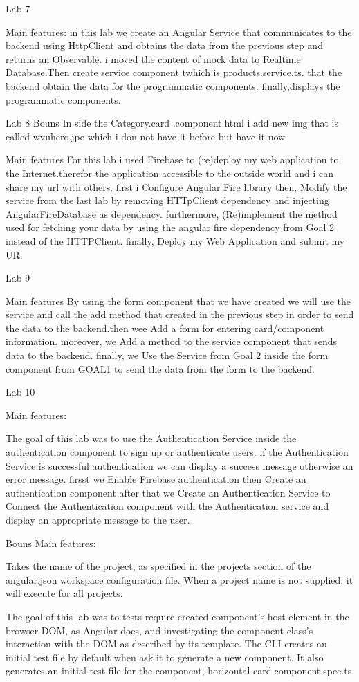 Lab 7

Main features:
in this lab we create an Angular Service that communicates to the backend using HttpClient and obtains the data from the previous step and returns an Observable. 
i moved the content of mock data to Realtime Database.Then create service component twhich  is products.service.ts. that the backend obtain the data for the programmatic components.
finally,displays the programmatic components.



Lab 8
 Bouns 
 In side the Category.card .component.html i add new img that is called wvuhero.jpe which i don not have it before but have it now 

 Main features
 For this lab i used Firebase to (re)deploy my web application to the Internet.therefor the application accessible to the outside world and i can share my url with others.
first i Configure Angular Fire library then, Modify the service from the last lab by removing HTTpClient dependency and injecting AngularFireDatabase as dependency.
furthermore, (Re)implement the method used for fetching your data by using the angular fire dependency from Goal 2 instead of the HTTPClient.
finally,  Deploy my Web Application and submit my UR.

 Lab 9

 Main features
 By using the form component that we have  created we will use the service and call the add method that created in the previous 
 step in order to send the data to the backend.then wee Add a form for entering card/component information.
moreover, we Add a method to the service component that sends data to the backend. finally, we
Use the Service from Goal 2 inside the form component from GOAL1 to send the data from the form to the backend.


Lab 10

Main features:

The goal of this lab was to use the Authentication Service inside the authentication component to sign up or authenticate users.
if the Authentication Service is successful authentication we can  display a success message otherwise an error message. 
firsst we Enable Firebase authentication then Create an authentication component after that we Create an Authentication Service 
to Connect the Authentication component with the Authentication service and display an appropriate message to the user.



Bouns 
Main features:

Takes the name of the project, as specified in the projects section of the angular.json workspace configuration file.
 When a project name is not supplied, it will execute for all projects.

The goal of this lab was to tests require created component's host element in the browser DOM, as Angular does, 
and investigating the component class's interaction with the DOM as described by its template.
The CLI creates an initial test file by default when ask it to generate a new component.
It also generates an initial test file for the component, horizontal-card.component.spec.ts


